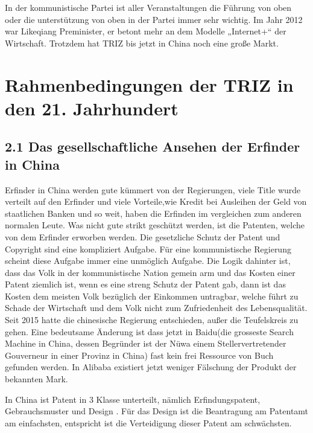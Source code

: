 \documentclass[11pt,a4paper]{article}
\begin{document}
In der kommunistische Partei ist aller Veranstaltungen die Führung von oben
oder die unterstützung von oben in der Partei immer sehr wichtig. Im Jahr 2012
war Likeqiang Preminister, er betont mehr an dem Modelle „Internet+“ der
Wirtschaft. Trotzdem hat TRIZ bis jetzt in China noch eine große Markt.


\section{Rahmenbedingungen der TRIZ in den 21. Jahrhundert}

\subsection{2.1 Das gesellschaftliche Ansehen der Erfinder in China}

Erfinder in China werden gute kümmert von der Regierungen, viele Title wurde
verteilt auf den Erfinder und viele Vorteile,wie Kredit bei Ausleihen der Geld
von staatlichen Banken und so weit, haben die Erfinden im vergleichen zum
anderen normalen Leute. Was nicht gute strikt geschützt werden, ist die
Patenten, welche von dem Erfinder erworben werden. Die gesetzliche Schutz der
Patent und Copyright sind eine kompliziert Aufgabe. Für eine kommunistische
Regierung scheint diese Aufgabe immer eine unmöglich Aufgabe. Die Logik
dahinter ist, dass das Volk in der kommunistische Nation gemein arm und das
Kosten einer Patent ziemlich ist, wenn es eine streng Schutz der Patent gab,
dann ist das Kosten dem meisten Volk bezüglich der Einkommen untragbar, welche
führt zu Schade der Wirtschaft und dem Volk nicht zum Zufriedenheit des
Lebensqualität. Seit 2015 hatte die chinesische Regierung entschieden, außer
die Teufelskreis zu gehen. Eine bedeutsame Änderung ist dass jetzt in
Baidu(die grosseste Search Machine in China, dessen Begründer ist der Nüwa
einem Stellervertretender Gouverneur in einer Provinz in China) fast kein frei
Ressource von Buch gefunden werden. In Alibaba existiert jetzt weniger
Fälschung der Produkt der bekannten Mark.

In China ist Patent in 3 Klasse unterteilt, nämlich Erfindungspatent,
Gebrauchsmuster und Design . Für das Design ist die Beantragung am Patentamt
am einfachsten, entspricht ist die Verteidigung dieser Patent am schwächsten.
\end{document}
